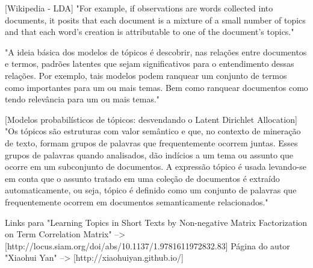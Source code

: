 


[Wikipedia - LDA]
"For example, if observations are words collected into documents, it posits that each document is a mixture of a small number of topics and that each word's creation is attributable to one of the document's topics."

"A ideia básica dos modelos de tópicos é descobrir, nas relações entre documentos e termos, padrões latentes que sejam significativos para o entendimento dessas relações. Por exemplo, tais modelos podem ranquear um conjunto de termos como importantes para um ou mais temas. Bem como ranquear documentos como tendo relevância para um ou mais temas."


[Modelos probabilísticos de tópicos: desvendando o Latent Dirichlet Allocation]
"Os tópicos são estruturas com valor semântico e que, no contexto de mineração de texto, formam grupos de palavras que frequentemente ocorrem juntas. Esses grupos de palavras quando analisados, dão indícios a um tema ou assunto que ocorre em um subconjunto de documentos. A expressão tópico é usada levando-se em conta que o assunto tratado em uma coleção de documentos é extraído automaticamente, ou seja, tópico é definido como um conjunto de palavras que frequentemente ocorrem em documentos semanticamente relacionados."










Links para "Learning Topics in Short Texts by Non-negative Matrix Factorization on Term Correlation Matrix" --> [http://locus.siam.org/doi/abs/10.1137/1.9781611972832.83]
Página do autor "Xiaohui Yan" --> [http://xiaohuiyan.github.io/]




